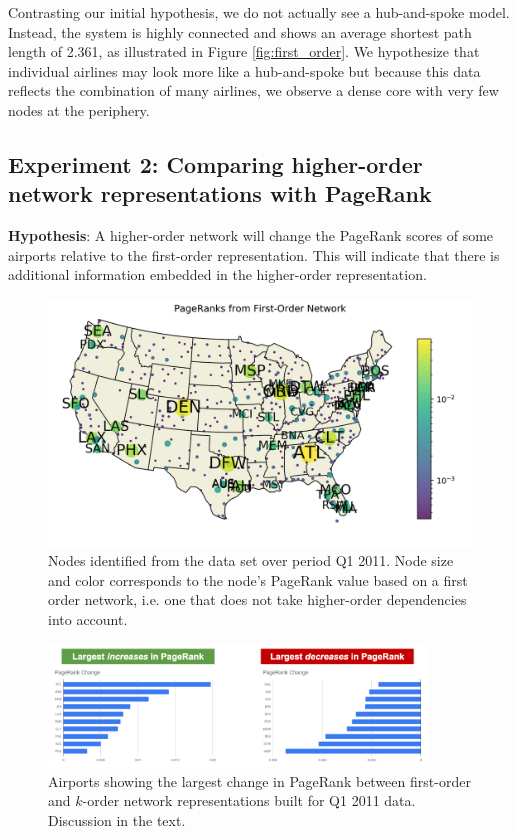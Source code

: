 \documentclass[sigconf]{acmart}
\begin{document}
Contrasting our initial hypothesis, we do not actually see a hub-and-spoke model. Instead, the system is highly connected and shows an average shortest path length of 2.361, as illustrated in Figure \ref{fig:first_order}. We hypothesize that individual airlines may look more like a hub-and-spoke but because this data reflects the combination of many airlines, we observe a dense core with very few nodes at the periphery.

\subsection{Experiment 2: Comparing higher-order network representations with PageRank}
\textbf{Hypothesis}: A higher-order network will change the PageRank scores of some airports relative to the first-order representation. This will indicate that there is additional information embedded in the higher-order representation.

\begin{figure}[t]
    \centering
    \includegraphics[width=\textwidth]{PageRank_fon_map.png}
    \caption{Nodes identified from the data set over period Q1 2011. Node size and color corresponds to the node's PageRank value based on a first order network, i.e. one that does not take higher-order dependencies into account.}
    \label{fig:fon-map}
\end{figure}

\begin{figure}[t]
    \centering
    \includegraphics[width=0.9\textwidth]{pagerank_demo.png}
    \caption{Airports showing the largest change in PageRank between first-order and $k$-order network representations built for Q1 2011 data. Discussion in the text.}
    \label{fig:pagerank_changes}
\end{figure}
\end{document}
